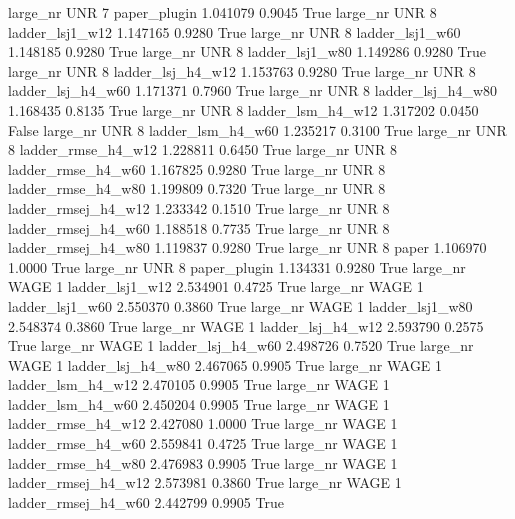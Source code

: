  large_nr      UNR                 7        paper_plugin   1.041079      0.9045    True
  large_nr      UNR                 8     ladder_lsj1_w12   1.147165      0.9280    True
  large_nr      UNR                 8     ladder_lsj1_w60   1.148185      0.9280    True
  large_nr      UNR                 8     ladder_lsj1_w80   1.149286      0.9280    True
  large_nr      UNR                 8   ladder_lsj_h4_w12   1.153763      0.9280    True
  large_nr      UNR                 8   ladder_lsj_h4_w60   1.171371      0.7960    True
  large_nr      UNR                 8   ladder_lsj_h4_w80   1.168435      0.8135    True
  large_nr      UNR                 8   ladder_lsm_h4_w12   1.317202      0.0450   False
  large_nr      UNR                 8   ladder_lsm_h4_w60   1.235217      0.3100    True
  large_nr      UNR                 8  ladder_rmse_h4_w12   1.228811      0.6450    True
  large_nr      UNR                 8  ladder_rmse_h4_w60   1.167825      0.9280    True
  large_nr      UNR                 8  ladder_rmse_h4_w80   1.199809      0.7320    True
  large_nr      UNR                 8 ladder_rmsej_h4_w12   1.233342      0.1510    True
  large_nr      UNR                 8 ladder_rmsej_h4_w60   1.188518      0.7735    True
  large_nr      UNR                 8 ladder_rmsej_h4_w80   1.119837      0.9280    True
  large_nr      UNR                 8               paper   1.106970      1.0000    True
  large_nr      UNR                 8        paper_plugin   1.134331      0.9280    True
  large_nr     WAGE                 1     ladder_lsj1_w12   2.534901      0.4725    True
  large_nr     WAGE                 1     ladder_lsj1_w60   2.550370      0.3860    True
  large_nr     WAGE                 1     ladder_lsj1_w80   2.548374      0.3860    True
  large_nr     WAGE                 1   ladder_lsj_h4_w12   2.593790      0.2575    True
  large_nr     WAGE                 1   ladder_lsj_h4_w60   2.498726      0.7520    True
  large_nr     WAGE                 1   ladder_lsj_h4_w80   2.467065      0.9905    True
  large_nr     WAGE                 1   ladder_lsm_h4_w12   2.470105      0.9905    True
  large_nr     WAGE                 1   ladder_lsm_h4_w60   2.450204      0.9905    True
  large_nr     WAGE                 1  ladder_rmse_h4_w12   2.427080      1.0000    True
  large_nr     WAGE                 1  ladder_rmse_h4_w60   2.559841      0.4725    True
  large_nr     WAGE                 1  ladder_rmse_h4_w80   2.476983      0.9905    True
  large_nr     WAGE                 1 ladder_rmsej_h4_w12   2.573981      0.3860    True
  large_nr     WAGE                 1 ladder_rmsej_h4_w60   2.442799      0.9905    True
